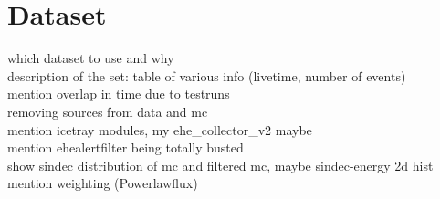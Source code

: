 \chapter{Dataset}
which dataset to use and why\\
description of the set: table of various info (livetime, number of events)\\
mention overlap in time due to testruns\\
removing sources from data and mc\\
mention icetray modules, my ehe\_collector\_v2 maybe\\
mention ehealertfilter being totally busted\\
show sindec distribution of mc and filtered mc, maybe sindec-energy 2d hist\\
mention weighting (Powerlawflux)\\

